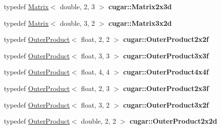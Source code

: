 \begin{DoxyCompactItemize}
\item 
\mbox{\label{group___matrices_module_ga5efd42544f89b78910969bc10828e746}} 
typedef \hyperlink{structcugar_1_1_matrix}{Matrix}$<$ double, 2, 3 $>$ {\bfseries cugar\+::\+Matrix2x3d}
\item 
\mbox{\label{group___matrices_module_ga6ccc4c42c2df59dc0de807877e52d4f2}} 
typedef \hyperlink{structcugar_1_1_matrix}{Matrix}$<$ double, 3, 2 $>$ {\bfseries cugar\+::\+Matrix3x2d}
\item 
\mbox{\label{group___matrices_module_gab3ec799023932b74d7020eaa3dc54702}} 
typedef \hyperlink{structcugar_1_1_outer_product}{Outer\+Product}$<$ float, 2, 2 $>$ {\bfseries cugar\+::\+Outer\+Product2x2f}
\item 
\mbox{\label{group___matrices_module_gacfe78f63eeb80f474f5cfd9eddeb5698}} 
typedef \hyperlink{structcugar_1_1_outer_product}{Outer\+Product}$<$ float, 3, 3 $>$ {\bfseries cugar\+::\+Outer\+Product3x3f}
\item 
\mbox{\label{group___matrices_module_ga37389281a808dd197f939efcd1f23ff5}} 
typedef \hyperlink{structcugar_1_1_outer_product}{Outer\+Product}$<$ float, 4, 4 $>$ {\bfseries cugar\+::\+Outer\+Product4x4f}
\item 
\mbox{\label{group___matrices_module_gac6a8f5b85b3b225f645a40c30e54eac3}} 
typedef \hyperlink{structcugar_1_1_outer_product}{Outer\+Product}$<$ float, 2, 3 $>$ {\bfseries cugar\+::\+Outer\+Product2x3f}
\item 
\mbox{\label{group___matrices_module_gafd9a81a408ca566e16f7d3276d96e24a}} 
typedef \hyperlink{structcugar_1_1_outer_product}{Outer\+Product}$<$ float, 3, 2 $>$ {\bfseries cugar\+::\+Outer\+Product3x2f}
\item 
\mbox{\label{group___matrices_module_ga2ef7fdfa0787d2353454b36ddc5b2ee7}} 
typedef \hyperlink{structcugar_1_1_outer_product}{Outer\+Product}$<$ double, 2, 2 $>$ {\bfseries cugar\+::\+Outer\+Product2x2d}
\item 
\mbox{\label{group___matrices_module_ga4aa94262cd1cd974a1efac0cc160fec9}} 

\end{DoxyCompactItemize}
